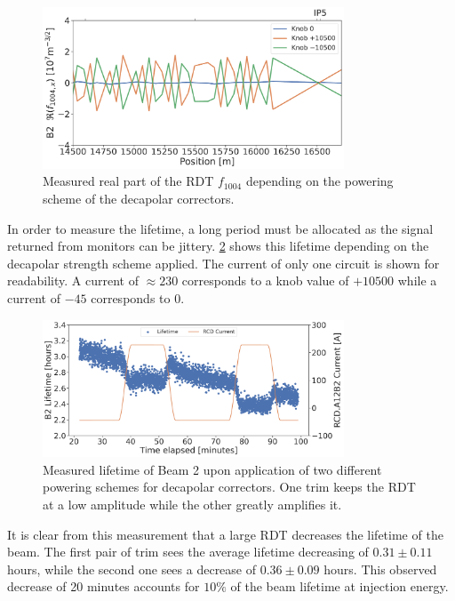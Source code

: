 \begin{figure}[!htb]
    \centering
    \includegraphics[width=0.8\textwidth]{./images/f1004/f1004x_knob_alt_lifetime_real.pdf}
    \caption{Measured real part of the RDT $f_{1004}$ depending on the powering scheme of the decapolar
    correctors.}
    \label{fig:decapoles:impact:alternating_knob}
\end{figure}

In order to measure the lifetime, a long period must be allocated as the signal returned from
monitors can be jittery. \cref{fig:decapoles:impact:b5_lifetime} shows this lifetime depending on
the decapolar strength scheme applied. The current of only one circuit is shown for readability.
A current of $\approx 230$ corresponds to a knob value of $+10500$ while a current of $-45$
corresponds to $0$.

\begin{figure}[!htb]
    \centering
    \includegraphics[width=0.8\textwidth]{./images/b5_lifetime.pdf}
    \caption{Measured lifetime of Beam 2 upon application of two different powering schemes for
    decapolar correctors. One trim keeps the RDT at a low amplitude while the other greatly
    amplifies it.}
    \label{fig:decapoles:impact:b5_lifetime}
\end{figure}

It is clear from this measurement that a large RDT decreases the lifetime of the beam.
The first pair of trim sees the average lifetime decreasing of $0.31 \pm 0.11$ hours, while the
second one sees a decrease of $0.36 \pm 0.09$ hours. This observed decrease of 20 minutes accounts
for $10\%$ of the beam lifetime at injection energy.





